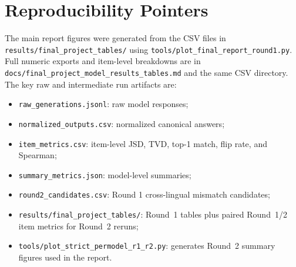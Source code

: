 \documentclass[11pt]{article}
\begin{document}
\appendix
\renewcommand{\thesection}{Appendix:}
\setcounter{section}{0}
\section{Reproducibility Pointers}

The main report figures were generated from the CSV files in \texttt{results/final\_project\_tables/} using \texttt{tools/plot\_final\_report\_round1.py}. Full numeric exports and item-level breakdowns are in \texttt{docs/final\_project\_model\_results\_tables.md} and the same CSV directory. The key raw and intermediate run artifacts are:

\begin{itemize}[leftmargin=*]
  \item \texttt{raw\_generations.jsonl}: raw model responses;
  \item \texttt{normalized\_outputs.csv}: normalized canonical answers;
  \item \texttt{item\_metrics.csv}: item-level JSD, TVD, top-1 match, flip rate, and Spearman;
  \item \texttt{summary\_metrics.json}: model-level summaries;
  \item \texttt{round2\_candidates.csv}: Round 1 cross-lingual mismatch candidates;
  \item \texttt{results/final\_project\_tables/}: Round~1 tables plus paired Round~1/2 item metrics for Round~2 reruns;
  \item \texttt{tools/plot\_strict\_permodel\_r1\_r2.py}: generates Round~2 summary figures used in the report.
\end{itemize}
\end{document}
